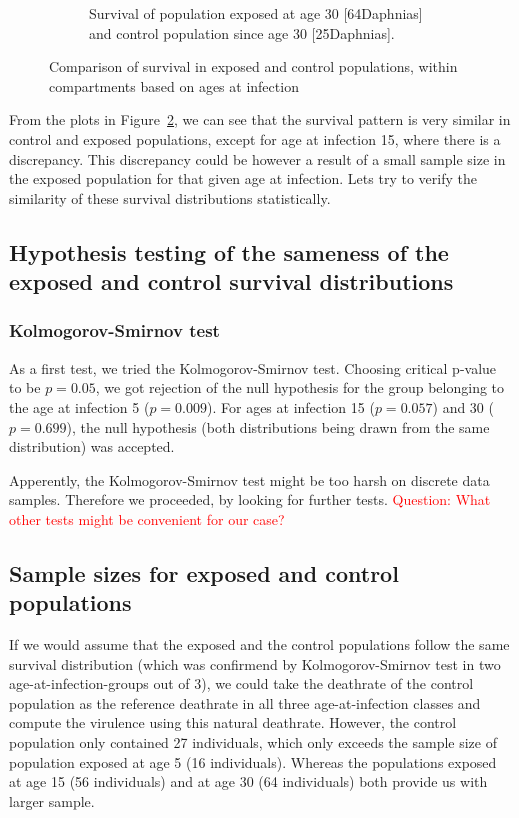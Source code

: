 \documentclass[10pt]{article}         %
\begin{document}
\begin{figure}[H]
\begin{subfigure}[b]{0.6\textwidth}
    \caption{Survival of population exposed at age 30 [64Daphnias] and control population since age 30 [25Daphnias].}
    \label{fig:subfigure_4}
  \end{subfigure}
  \caption{Comparison of survival in exposed and control populations, within compartments based on ages at infection}
  \label{survivals_exp_control}
\end{figure}

From the plots in Figure~\ref{survivals_exp_control}, we can see that the survival pattern is very similar in control and exposed populations, except for age at infection 15, where there is a discrepancy. This discrepancy could be however a result of a small sample size in the exposed population for that given age at infection. Lets try to verify the similarity of these survival distributions statistically.

\subsection{Hypothesis testing of the sameness of the exposed and control survival distributions}

\subsubsection{Kolmogorov-Smirnov test}
As a first test, we tried the Kolmogorov-Smirnov test. Choosing critical p-value to be $p=0.05$, we got rejection of the null hypothesis for the group belonging to the age at infection 5 ($p=0.009 $). For ages at infection 15 ($p=0.057$) and 30 ($p=0.699$), the null hypothesis (both distributions being drawn from the same distribution) was accepted.

Apperently, the Kolmogorov-Smirnov test might be too harsh on discrete data samples. Therefore we proceeded, by looking for further tests.\newline\newline
\textcolor{red}{Question: What other tests might be convenient for our case?}

\subsection{Sample sizes for exposed and control populations}

If we would assume that the exposed and the control populations follow the same survival distribution (which was confirmend by Kolmogorov-Smirnov test in two age-at-infection-groups out of 3), we could take the deathrate of the control population as the reference deathrate in all three age-at-infection classes and compute the virulence using this natural deathrate.
	However, the control population only contained 27 individuals, which only exceeds the sample size of population exposed at age 5 (16 individuals). Whereas the populations exposed at age 15 (56 individuals) and at age 30 (64 individuals) both provide us with larger sample.
	
\end{document}
